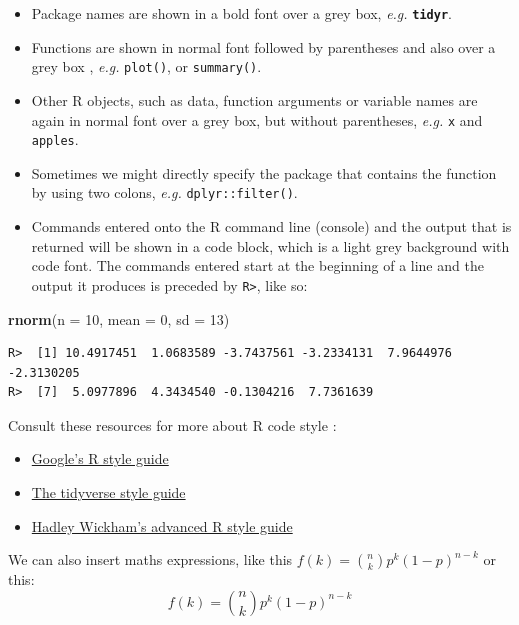 \documentclass[
]{book}
\newenvironment{Shaded}{\begin{snugshade}}{\end{snugshade}}
\newcommand{\DataTypeTok}[1]{\textcolor[rgb]{0.13,0.29,0.53}{#1}}
\newcommand{\DecValTok}[1]{\textcolor[rgb]{0.00,0.00,0.81}{#1}}
\newcommand{\KeywordTok}[1]{\textcolor[rgb]{0.13,0.29,0.53}{\textbf{#1}}}
\newcommand{\NormalTok}[1]{#1}
\providecommand{\tightlist}{%
  \setlength{\itemsep}{0pt}\setlength{\parskip}{0pt}}
\begin{document}
\begin{itemize}
\tightlist
\item
  Package names are shown in a bold font over a grey box, \emph{e.g.} \textbf{\texttt{tidyr}}.
\item
  Functions are shown in normal font followed by parentheses and also over a grey box , \emph{e.g.} \texttt{plot()}, or \texttt{summary()}.
\item
  Other R objects, such as data, function arguments or variable names are again in normal font over a grey box, but without parentheses, \emph{e.g.} \texttt{x} and \texttt{apples}.
\item
  Sometimes we might directly specify the package that contains the function by using two colons, \emph{e.g.} \texttt{dplyr::filter()}.
\item
  Commands entered onto the R command line (console) and the output that is returned will be shown in a code block, which is a light grey background with code font. The commands entered start at the beginning of a line and the output it produces is preceded by \texttt{R\textgreater{}}, like so:
\end{itemize}

\begin{Shaded}
\begin{Highlighting}[]
\KeywordTok{rnorm}\NormalTok{(}\DataTypeTok{n =} \DecValTok{10}\NormalTok{, }\DataTypeTok{mean =} \DecValTok{0}\NormalTok{, }\DataTypeTok{sd =} \DecValTok{13}\NormalTok{)}
\end{Highlighting}
\end{Shaded}

\begin{verbatim}
R>  [1] 10.4917451  1.0683589 -3.7437561 -3.2334131  7.9644976 -2.3130205
R>  [7]  5.0977896  4.3434540 -0.1304216  7.7361639
\end{verbatim}

Consult these resources for more about R code style :

\begin{itemize}
\tightlist
\item
  \href{https://google.github.io/styleguide/Rguide.xml}{Google's R style guide}
\item
  \href{http://style.tidyverse.org}{The tidyverse style guide}
\item
  \href{http://adv-r.had.co.nz/Style.html}{Hadley Wickham's advanced R style guide}
\end{itemize}

We can also insert maths expressions, like this \(f(k) = {n \choose k} p^{k} (1-p)^{n-k}\) or this: \[f(k) = {n \choose k} p^{k} (1-p)^{n-k}\]
\end{document}
